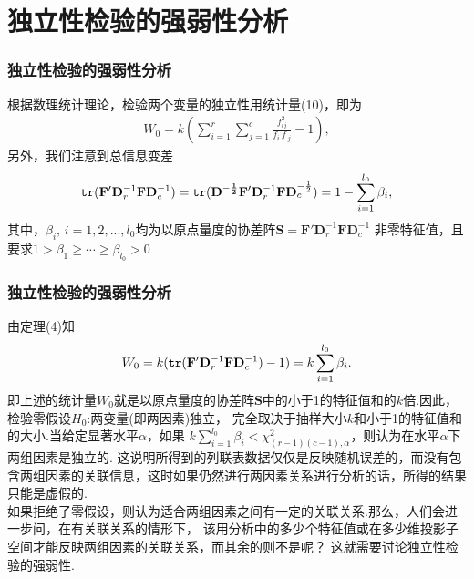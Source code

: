\section{独立性检验的强弱性分析}

\begin{frame}\frametitle{\color{blue}独立性检验的强弱性分析}
\quad\quad {\color{magenta} {\hei 1. 基本思想}}
 \vskip0.3cm
\begin{footnotesize}
根据数理统计理论，检验两个变量的独立性用统计量(10)，即为
\begin{eqnarray}
    W_{0}=k(\sum^{r}_{i=1}\sum^{c}_{j=1}\frac{f_{ij}^{2}}{f_{i.}f_{.j}}-1),
\end{eqnarray}
另外，我们注意到总信息变差
\begin{eqnarray}
   {\tt{tr}}(\mathbf{F}'\mathbf{D}^{-1}_{r}\mathbf{F}\mathbf{D}^{-1}_{c})=
       {\tt{tr}}(\mathbf{D^{-\frac{1}{2}}}\mathbf{F}'\mathbf{D}^{-1}_{r}\mathbf{F}\mathbf{D}^{-\frac{1}{2}}_{c})=
       1-\sum^{l_{0}}_{i=1}\beta_{i},
\end{eqnarray}
其中，$\beta_{i},\,
i=1,2,...,l_{0}$均为以原点量度的协差阵$\mathbf{S}=\mathbf{F}'\mathbf{D}^{-1}_{r}\mathbf{F}\mathbf{D}^{-1}_{c}$
非零特征值，且要求$1>\beta_{1}\geq\cdots\geq\beta_{l_{0}}>0$
\end{footnotesize}

\end{frame}
\begin{frame}\frametitle{\color{blue}独立性检验的强弱性分析}

\begin{footnotesize}
由定理(4)知
\begin{eqnarray}
   W_{0}=k({\tt{tr}}(\mathbf{F}'\mathbf{D}^{-1}_{r}\mathbf{F}\mathbf{D}^{-1}_{c})-1)=k\sum^{l_{0}}_{i=1}\beta_{i}.
\end{eqnarray}
即上述的统计量$W_{0}$就是以原点量度的协差阵$\mathbf{S}$中的小于1的特征值和的$k$倍.因此，检验零假设$H_{0}$:两变量(即两因素)独立，
完全取决于抽样大小$k$和小于1的特征值和的大小.当给定显著水平$\alpha$，如果
$k
\sum^{l_{0}}_{i=1}\beta_{i}<\chi^{2}_{(r-1)(c-1),\alpha}$，则认为在水平$\alpha$下两组因素是独立的.
这说明所得到的列联表数据仅仅是反映随机误差的，而没有包
含两组因素的关联信息，这时如果仍然进行两因素关系进行分析的话，所得的结果只能是虚假的.\\
如果拒绝了零假设，则认为适合两组因素之间有一定的关联关系.那么，人们会进一步问，在有关联关系的情形下，
该用分析中的多少个特征值或在多少维投影子空间才能反映两组因素的关联关系，而其余的则不是呢？
这就需要讨论独立性检验的强弱性.
\end{footnotesize}

\end{frame}
